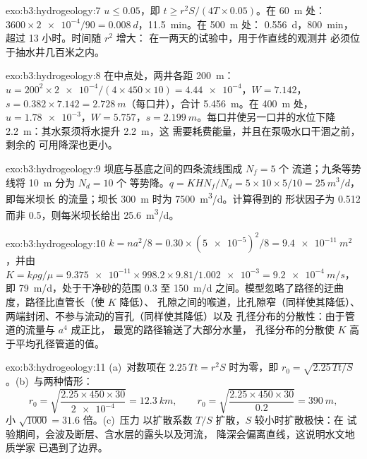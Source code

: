 \begin{solution}{exo:b3:hydrogeology:7}
$u \le 0.05$，即 $t \ge r^2S/(4T\times0.05)$。在 \qty{60}{m} 处：$3600\times
\num{2e-4}/90 = \qty{0.008}{d}$，\qty{11.5}{min}。在 \qty{500}{m} 处：
\qty{0.556}{d}，\qty{800}{min}，超过 13 小时。时间随 $r^2$ 增大：
在一两天的试验中，用于作直线的观测井
必须位于抽水井几百米之内。
\end{solution}

\begin{solution}{exo:b3:hydrogeology:8}
在中点处，两井各距 \qty{200}{m}：$u = 200^2\times\num{2e-4}/(4
\times450\times10) = \num{4.44e-4}$，$W = \num{7.142}$，$s = 0.382\times
7.142 = \qty{2.728}{m}$（每口井），合计 \qty{5.456}{m}。在
\qty{400}{m} 处，$u = \num{1.78e-3}$，$W = \num{5.757}$，$s =
\qty{2.199}{m}$。每口井使另一口井的水位下降
\qty{2.2}{m}：其水泵须将水提升 \qty{2.2}{m}，这
需要耗费能量，并且在泵吸水口干涸之前，剩余的
可用降深也更小。
\end{solution}

\begin{solution}{exo:b3:hydrogeology:9}
坝底与基底之间的四条流线围成 $N_f = 5$ 个
流道；九条等势线将 \qty{10}{m} 分为 $N_d = 10$ 个
等势降。$q = KHN_f/N_d = 5\times10\times5/10 = \qty{25}{m^3/d}$，即每米坝长
的流量；坝长 \qty{300}{m} 时为 \qty{7500}{m^3/d}。计算得到的
形状因子为 0.512 而非 0.5，则每米坝长给出 \qty{25.6}{m^3/d}。
\end{solution}

\begin{solution}{exo:b3:hydrogeology:10}
$k = na^2/8 = 0.30\times(\num{5e-5})^2/8 = \qty{9.4e-11}{m^2}$，并由 $K =
k\rho g/\mu = \num{9.375e-11}\times998.2\times9.81/\num{1.002e-3} =
\qty{9.2e-4}{m/s}$，即 \qty{79}{m/d}，处于干净砂的范围 0.3 至
\qty{150}{m/d} 之间。模型忽略了路径的迂曲度，路径比直管长（使 $K$ 降低）、
孔隙之间的喉道，比孔隙窄（同样使其降低）、
两端封闭、不参与流动的盲孔（同样使其降低）以及
孔径分布的分散性：由于管道的流量与 $a^4$ 成正比，
最宽的路径输送了大部分水量，
孔径分布的分散使 $K$ 高于平均孔径管道的值。
\end{solution}

\begin{solution}{exo:b3:hydrogeology:11}
(a)~对数项在 $2.25\,Tt = r^2S$ 时为零，即 $r_0 =
\sqrt{2.25\,Tt/S}$。(b)~与两种情形：
\[
r_0 = \sqrt{\frac{2.25\times450\times30}{\num{2e-4}}} = \qty{12.3}{km},
\qquad r_0 = \sqrt{\frac{2.25\times450\times30}{0.2}} = \qty{390}{m},
\]
小 $\sqrt{1000} = 31.6$ 倍。(c)~压力
以扩散系数 $T/S$ 扩散，$S$ 较小时扩散极快：在
试验期间，会波及断层、含水层的露头以及河流，
降深会偏离直线，这说明水文地质学家
已遇到了边界。
\end{solution}

